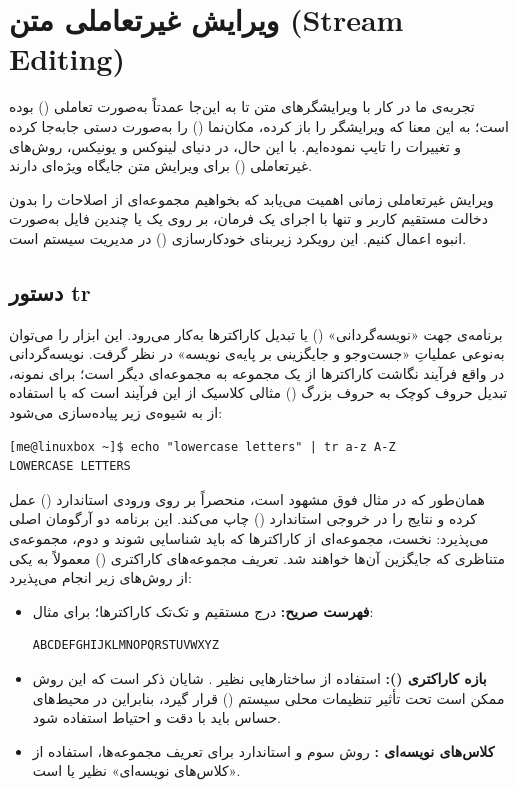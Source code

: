 \section{ویرایش غیرتعاملی متن (Stream Editing)}

تجربه‌ی ما در کار با ویرایشگرهای متن تا به این‌جا عمدتاً به‌صورت تعاملی () بوده است؛ به این معنا که ویرایشگر را باز کرده، مکان‌نما () را به‌صورت دستی جابه‌جا کرده و تغییرات را تایپ نموده‌ایم. با این حال، در دنیای لینوکس و یونیکس، روش‌های غیرتعاملی () برای ویرایش متن جایگاه ویژه‌ای دارند.

ویرایش غیرتعاملی زمانی اهمیت می‌یابد که بخواهیم مجموعه‌ای از اصلاحات را بدون دخالت مستقیم کاربر و تنها با اجرای یک فرمان، بر روی یک یا چندین فایل به‌صورت انبوه اعمال کنیم. این رویکرد زیربنای خودکارسازی () در مدیریت سیستم است.

\subsection{دستور tr}

برنامه‌ی  جهت «نویسه‌گردانی» () یا تبدیل کاراکترها به‌کار می‌رود. این ابزار را می‌توان به‌نوعی عملیاتِ «جست‌وجو و جایگزینی بر پایه‌ی نویسه» در نظر گرفت. نویسه‌گردانی در واقع فرآیند نگاشت کاراکترها از یک مجموعه به مجموعه‌ای دیگر است؛ برای نمونه، تبدیل حروف کوچک به حروف بزرگ () مثالی کلاسیک از این فرآیند است که با استفاده از  به شیوه‌ی زیر پیاده‌سازی می‌شود:

\begin{latin}
\begin{lstlisting}
[me@linuxbox ~]$ echo "lowercase letters" | tr a-z A-Z
LOWERCASE LETTERS
\end{lstlisting}
\end{latin}

همان‌طور که در مثال فوق مشهود است،  منحصراً بر روی ورودی استاندارد () عمل کرده و نتایج را در خروجی استاندارد () چاپ می‌کند. این برنامه دو آرگومان اصلی می‌پذیرد: نخست، مجموعه‌ای از کاراکترها که باید شناسایی شوند و دوم، مجموعه‌ی متناظری که جایگزین آن‌ها خواهند شد. تعریف مجموعه‌های کاراکتری () معمولاً به یکی از روش‌های زیر انجام می‌پذیرد:

\begin{itemize}
  \item \textbf{فهرست صریح:} درج مستقیم و تک‌تک کاراکترها؛ برای مثال:
\begin{latin}
\begin{lstlisting}
ABCDEFGHIJKLMNOPQRSTUVWXYZ
\end{lstlisting}
\end{latin}
  \item \textbf{بازه کاراکتری ():} استفاده از ساختارهایی نظیر . شایان ذکر است که این روش ممکن است تحت تأثیر تنظیمات محلی سیستم () قرار گیرد، بنابراین در محیط‌های حساس باید با دقت و احتیاط استفاده شود.
  \item \textbf{کلاس‌های نویسه‌ای :} روش سوم و استاندارد برای تعریف مجموعه‌ها، استفاده از «کلاس‌های نویسه‌ای» نظیر \cmd{[:upper:]} یا \cmd{[:lower:]} است.
\end{itemize}

